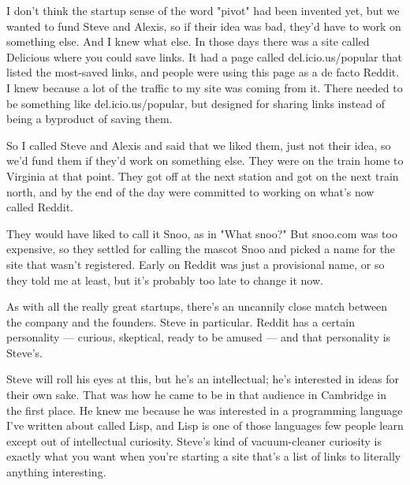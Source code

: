 I don't
                  think the startup sense of the word "pivot" had been invented
                  yet, but we wanted to fund Steve and Alexis, so if their idea
                  was bad, they'd have to work on something else. And I knew
                  what else. In those days there was a site called Delicious
                  where you could save links. It had a page called
                  del.icio.us/popular that listed the most-saved links, and
                  people were using this page as a de facto Reddit. I knew
                  because a lot of the traffic to my site was coming from it.
                  There needed to be something like del.icio.us/popular, but
                  designed for sharing links instead of being a byproduct of
                  saving them.

So I called Steve and Alexis and said
                  that we liked them, just not their idea, so we'd fund them if
                  they'd work on something else. They were on the train home to
                  Virginia at that point. They got off at the next station and
                  got on the next train north, and by the end of the day were
                  committed to working on what's now called Reddit.

They
                  would have liked to call it Snoo, as in "What snoo?" But
                  snoo.com was too expensive, so they settled for calling the
                  mascot Snoo and picked a name for the site that wasn't
                  registered. Early on Reddit was just a provisional name, or so
                  they told me at least, but it's probably too late to change it
                  now.

As with all the really great startups, there's
                  an uncannily close match between the company and the founders.
                  Steve in particular. Reddit has a certain personality ---
                  curious, skeptical, ready to be amused --- and that
                  personality is Steve's.

Steve will roll his eyes at
                  this, but he's an intellectual; he's interested in ideas for
                  their own sake. That was how he came to be in that audience in
                  Cambridge in the first place. He knew me because he was
                  interested in a programming language I've written about called
                  Lisp, and Lisp is one of those languages few people learn
                  except out of intellectual curiosity. Steve's kind of
                  vacuum-cleaner curiosity is exactly what you want when you're
                  starting a site that's a list of links to literally anything
                  interesting.

